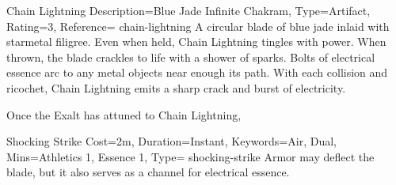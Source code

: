 \begin{Merit}{Chain Lightning}{%
    Description=Blue Jade Infinite Chakram,
    Type=Artifact,
    Rating=3,
    Reference=\cite*[p.~159]{ex3}
}{chain-lightning}
    A circular blade of blue jade inlaid with starmetal filigree. Even when
    held, Chain Lightning tingles with power. When thrown, the blade crackles
    to life with a shower of sparks. Bolts of electrical essence arc to any
    metal objects near enough its path. With each collision and ricochet, Chain
    Lightning emits a sharp crack and burst of electricity.



    Once the Exalt has attuned to Chain Lightning, 

    \begin{Charm}{Shocking Strike}{%
        Cost=2m,
        Duration=Instant,
        Keywords={Air, Dual},
        Mins={Athletics 1, Essence 1},
        Type=\SupplementalType
    }{shocking-strike}
        Armor may deflect the blade, but it also serves as a channel for
        electrical essence. 
    \end{Charm}
\end{Merit}


